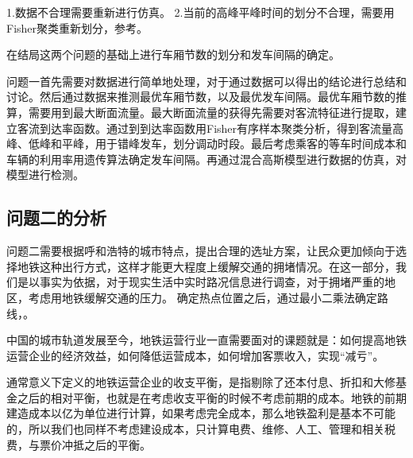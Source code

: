 \documentclass[12pt,a4paper]{mcmthesis}
\begin{document}
    1.数据不合理需要重新进行仿真。
    2.当前的高峰平峰时间的划分不合理，需要用Fisher聚类重新划分，参考\cite{公交发车}。

    在结局这两个问题的基础上进行车厢节数的划分和发车间隔的确定。




        {问题一首先需要对数据进行简单地处理，对于通过数据可以得出的结论进行总结和讨论。然后通过数据来推测最优车厢节数，以及最优发车间隔。最优车厢节数的推算，需要用到最大断面流量。最大断面流量的获得先需要对客流特征进行提取，建立客流到达率函数。通过到到达率函数用Fisher有序样本聚类分析，得到客流量高峰、低峰和平峰，用于错峰发车，划分调动时段。最后考虑乘客的等车时间成本和车辆的利用率用遗传算法确定发车间隔。再通过混合高斯模型进行数据的仿真，对模型进行检测。}

    \subsection{问题二的分析}
    问题二需要根据呼和浩特的城市特点，提出合理的选址方案，让民众更加倾向于选择地铁这种出行方式，这样才能更大程度上缓解交通的拥堵情况。在这一部分，我们是以事实为依据，对于现实生活中实时路况信息进行调查，对于拥堵严重的地区，考虑用地铁缓解交通的压力。
    确定热点位置之后，通过最小二乘法确定路线，。
    
    中国的城市轨道发展至今，地铁运营行业一直需要面对的课题就是：如何提高地铁运营企业的经济效益，如何降低运营成本，如何增加客票收入，实现“减亏”。

    通常意义下定义的地铁运营企业的收支平衡，是指剔除了还本付息、折扣和大修基金之后的相对平衡，也就是在考虑收支平衡的时候不考虑前期的成本。地铁的前期建造成本以亿为单位进行计算，如果考虑完全成本，那么地铁盈利是基本不可能的，所以我们也同样不考虑建设成本，只计算电费、维修、人工、管理和相关税费，与票价冲抵之后的平衡。
\end{document}
